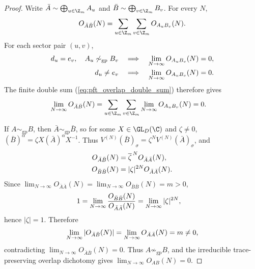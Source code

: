 \begin{proof}\leanok
    Write $\bar A\sim\bigoplus_{u\in\Z_m}A_u$ and
    $\bar B\sim\bigoplus_{v\in\Z_m}B_v$. For every $N$,
    \begin{align}
        O_{\bar A\bar B}(N)
        =
        \sum_{u\in\Z_m}\sum_{v\in\Z_m}O_{A_uB_v}(N).
        \label{eq:pft_overlap_double_sum}
    \end{align}
    For each sector pair $(u,v)$,
    \begin{align}
        d_u=e_v,\quad A_u\not\sim_{\mathrm{gp}}B_v
         & \quad\Longrightarrow\quad
        \lim_{N\to\infty}O_{A_uB_v}(N)=0, \notag \\
        d_u\ne e_v
         & \quad\Longrightarrow\quad
        \lim_{N\to\infty}O_{A_uB_v}(N)=0. \notag
    \end{align}
    The finite double sum (\ref{eq:pft_overlap_double_sum}) therefore gives
    \begin{align}
        \lim_{N\to\infty}O_{\bar A\bar B}(N)
         & =
        \sum_{u\in\Z_m}\sum_{v\in\Z_m}
        \lim_{N\to\infty}O_{A_uB_v}(N)
        =0. \notag
    \end{align}

    If $A\sim_{\mathrm{gp}}B$, then $\bar A\sim_{\mathrm{gp}}\bar B$, so for
    some $X\in\GL_D(\C)$ and $\zeta\ne0$,
    $(\bar B)^\alpha=\zeta X(\bar A)^\alpha X^{-1}$. Thus
    $V^{(N)}(\bar B)_\sigma=\zeta^N V^{(N)}(\bar A)_\sigma$, and
    \begin{align}
        O_{\bar A\bar B}(N)
         & =\overline{\zeta}^{\,N}O_{\bar A\bar A}(N), \notag \\
        O_{\bar B\bar B}(N)
         & =|\zeta|^{2N}O_{\bar A\bar A}(N). \notag
    \end{align}
    Since
    $\lim_{N\to\infty}O_{\bar A\bar A}(N)
        =\lim_{N\to\infty}O_{\bar B\bar B}(N)=m>0$,
    \begin{align}
        1
         & =
        \lim_{N\to\infty}
        \frac{O_{\bar B\bar B}(N)}{O_{\bar A\bar A}(N)}
        =
        \lim_{N\to\infty}|\zeta|^{2N}, \notag
    \end{align}
    hence $|\zeta|=1$. Therefore
    \begin{align}
        \lim_{N\to\infty}|O_{\bar A\bar B}(N)|
        =
        \lim_{N\to\infty}O_{\bar A\bar A}(N)
        =
        m\ne0, \notag
    \end{align}
    contradicting $\lim_{N\to\infty}O_{\bar A\bar B}(N)=0$. Thus
    $A\not\sim_{\mathrm{gp}}B$, and the irreducible trace-preserving overlap
    dichotomy gives $\lim_{N\to\infty}O_{AB}(N)=0$.
\end{proof}


